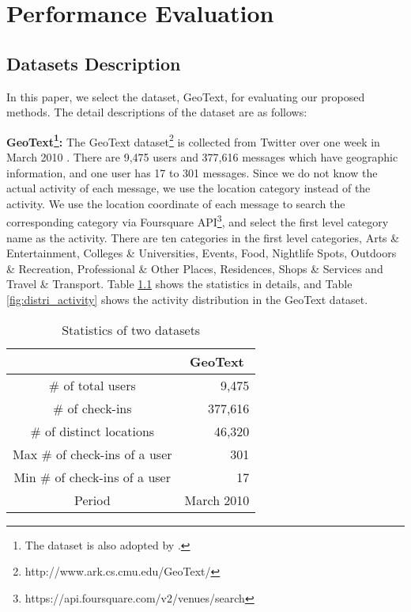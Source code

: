 \chapter{Performance Evaluation}
\label{sec:5}


\section{Datasets Description}
\label{sec:5-1}

In this paper, we select the dataset, GeoText, for evaluating our proposed methods. The detail descriptions of the dataset are as follows:

{\bf GeoText\footnote{The dataset is also adopted by \cite{13_KDD_Yuan}.}:} The GeoText dataset\footnote{http://www.ark.cs.cmu.edu/GeoText/} is collected from Twitter over one week in March 2010 \cite{10_EMNLP_Eisenstein}. There are 9,475 users and 377,616 messages which have geographic information, and one user has 17 to 301 messages. Since we do not know the actual activity of each message, we use the location category instead of the activity. We use the location coordinate of each message to search the corresponding category via Foursquare API\footnote{https://api.foursquare.com/v2/venues/search}, and select the first level category name as the activity. There are ten categories in the first level categories, Arts \& Entertainment, Colleges \& Universities, Events, Food, Nightlife Spots, Outdoors \& Recreation, Professional \& Other Places, Residences, Shops \& Services and Travel \& Transport. Table \ref{table:dataset} shows the statistics in details, and Table \ref{fig:distri_activity} shows the activity distribution in the GeoText dataset.



\begin{table}[]
\centering
\caption{Statistics of two datasets}
\label{table:dataset}
\begin{tabular}{cr}
\hline
                              & \multicolumn{1}{c}{GeoText} \\ \hline
\# of total users             & 9,475                       \\
\# of check-ins               & 377,616                     \\
\# of distinct locations      & 46,320                      \\
Max \# of check-ins of a user & 301                         \\
Min \# of check-ins of a user & 17                          \\
Period                        & March 2010                  \\ \hline
\end{tabular}
\end{table}



